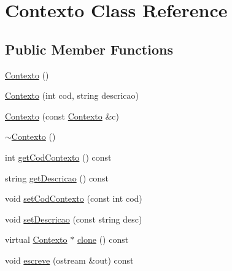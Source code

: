 \hypertarget{class_contexto}{\section{Contexto Class Reference}
\label{class_contexto}
}
\subsection*{Public Member Functions}
\begin{DoxyCompactItemize}
\item 
\hyperlink{class_contexto_a45fc2ae2a46045e388c1b5e57a45a8c8}{Contexto} ()
\item 
\hyperlink{class_contexto_ae3428919fdb01baf6ffaf6ab6fce7b1b}{Contexto} (int cod, string descricao)
\item 
\hyperlink{class_contexto_a76a8d3c29a326a4bcbd8729872eb5197}{Contexto} (const \hyperlink{class_contexto}{Contexto} \&c)
\item 
\hyperlink{class_contexto_afc52d61432131330522cae0c14606ecc}{$\sim$\-Contexto} ()
\item 
int \hyperlink{class_contexto_ad44e11caf524e2022cace54f30b73f3d}{get\-Cod\-Contexto} () const 
\item 
string \hyperlink{class_contexto_a08f4ead77db2463b140b0488b0821369}{get\-Descricao} () const 
\item 
void \hyperlink{class_contexto_a71e448b9173c8f54895a08a596f2dfb3}{set\-Cod\-Contexto} (const int cod)
\item 
void \hyperlink{class_contexto_a0cbfcf7dbc462848f716063524fb1376}{set\-Descricao} (const string desc)
\item 
virtual \hyperlink{class_contexto}{Contexto} $\ast$ \hyperlink{class_contexto_a95600ac2acc9874675796e835a5bbaf9}{clone} () const 
\item 
void \hyperlink{class_contexto_a88f0ba6a4eefb9ccac6a0600742e7c8f}{escreve} (ostream \&out) const 
\end{DoxyCompactItemize}


